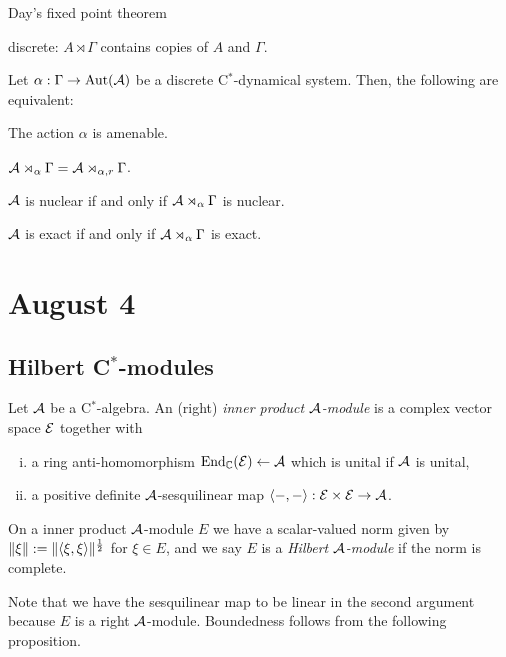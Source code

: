 \documentclass{../../../small}
\begin{document}
Day's fixed point theorem

discrete: $A\rtimes\Gamma$ contains copies of $A$ and $\Gamma$.

\begin{thm}
Let $\alpha:\Gamma\to\operatorname{Aut}(\mathcal{A})$ be a discrete C$^*$-dynamical system.
Then, the following are equivalent:
\begin{parts}
\item The action $\alpha$ is amenable.
\item $\mathcal{A}\rtimes_\alpha\Gamma=\mathcal{A}\rtimes_{\alpha,r}\Gamma$.
\item $\mathcal{A}$ is nuclear if and only if $\mathcal{A}\rtimes_\alpha\Gamma$ is nuclear.
\item $\mathcal{A}$ is exact if and only if $\mathcal{A}\rtimes_\alpha\Gamma$ is exact.
\end{parts}
\end{thm}
\fi


\newpage
\section{August 4}

\subsection{Hilbert C$^*$-modules}

\begin{defn}
Let $\mathcal{A}$ be a C$^*$-algebra.
An (right) \emph{inner product $\mathcal{A}$-module} is a complex vector space $\mathcal{E}$ together with
\begin{enumerate}[(i)]
\item
a ring anti-homomorphism $\operatorname{End}_{\mathbb{C}}(\mathcal{E})\leftarrow\mathcal{A}$ which is unital if $\mathcal{A}$ is unital,
\item
a positive definite $\mathcal{A}$-sesquilinear map $\langle-,-\rangle:\mathcal{E}\times\mathcal{E}\to\mathcal{A}$.
\end{enumerate}
On a inner product $\mathcal{A}$-module $E$ we have a scalar-valued norm given by $\|\xi\|:=\|\langle\xi,\xi\rangle\|^{\frac12}$ for $\xi\in E$, and we say $E$ is a \emph{Hilbert $\mathcal{A}$-module} if the norm is complete.
\end{defn}

Note that we have the sesquilinear map to be linear in the second argument because $E$ is a right $\mathcal{A}$-module.
Boundedness follows from the following proposition.
\end{document}

